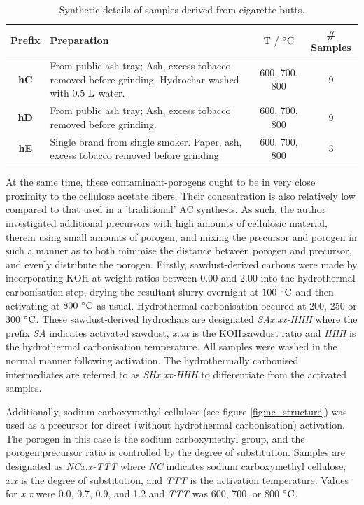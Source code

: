 \begin{table}[h]
\caption{Synthetic details of samples derived from cigarette butts.}
\label{tb:cb_synthesis}
\begin{tabularx}{\textwidth}{cXcc}
\toprule
\textbf{Prefix} & \textbf{Preparation} & \textbf{$\rm T\ /\ ^{\circ}C$} & \textbf{\# Samples} \\ 
\midrule
\textbf{hC}     & From public ash tray; Ash, excess tobacco removed before grinding. Hydrochar washed with $\rm 0.5\ L$ water.              & 600, 700, 800 & 9              \\
\textbf{hD}     &  From public ash tray; Ash, excess tobacco removed before grinding.             & 600, 700, 800 & 9             \\
\textbf{hE}     & Single brand from single smoker. Paper, ash, excess tobacco removed before grinding              & 600, 700, 800 & 3              \\
\bottomrule
\end{tabularx}%
\end{table}

At the same time, these contaminant-porogens ought to be in very close proximity to the cellulose acetate fibers. Their concentration is also relatively low compared to that used in a 'traditional' AC synthesis. As such, the author investigated additional precursors with high amounts of cellulosic material, therein using small amounts of porogen, and mixing the precursor and porogen in such a manner as to both minimise the distance between porogen and precursor, and evenly distribute the porogen. Firstly, sawdust-derived carbons were made by incorporating KOH at weight ratios between 0.00 and 2.00 into the hydrothermal carbonisation step, drying the resultant slurry overnight at $\rm 100\  ^{\circ}C$ and then activating at $\rm 800\ ^{\circ}C$ as usual. Hydrothermal carbonisation occured at 200, 250 or 300 $\rm ^{\circ}C$. These sawdust-derived hydrochars are designated \textit{SAx.xx-HHH} where the prefix \textit{SA} indicates activated sawdust, \textit{x.xx} is the KOH:sawdust ratio and \textit{HHH} is the hydrothermal carbonisation temperature. All samples were washed in the normal manner following activation. The hydrothermally carbonised intermediates are referred to as \textit{SHx.xx-HHH} to differentiate from the activated samples.

Additionally, sodium carboxymethyl cellulose (see figure \ref{fig:nc_structure}) was used as a precursor for direct (without hydrothermal carbonisation) activation. The porogen in this case is the sodium carboxymethyl group, and the porogen:precursor ratio is controlled by the degree of substitution. Samples are designated as \textit{NCx.x-TTT} where \textit{NC} indicates sodium carboxymethyl cellulose, \textit{x.x} is the degree of substitution, and \textit{TTT} is the activation temperature. Values for \textit{x.x} were 0.0, 0.7, 0.9, and 1.2 and \textit{TTT} was 600, 700, or 800 $\rm ^{\circ}C$.

